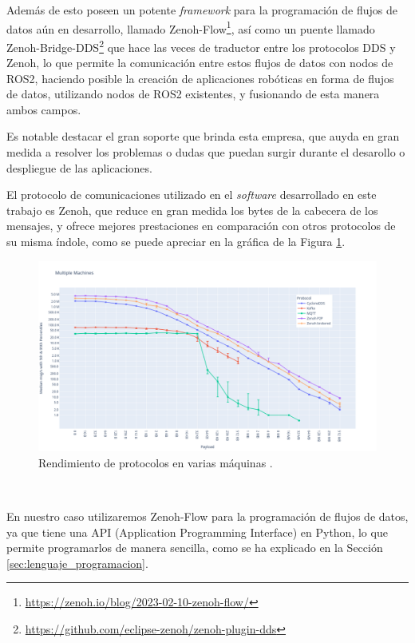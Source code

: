 Además de esto poseen un potente \textit{framework} para la programación de
flujos de datos aún en desarrollo, llamado
Zenoh-Flow\footnote{\url{https://zenoh.io/blog/2023-02-10-zenoh-flow/}}, así
como un puente llamado
Zenoh-Bridge-DDS\footnote{\url{https://github.com/eclipse-zenoh/zenoh-plugin-dds}}
que hace las veces de traductor entre los protocolos DDS y Zenoh, lo que permite
la comunicación entre estos flujos de datos con nodos de ROS2, haciendo posible
la creación de aplicaciones robóticas en forma de flujos de datos, utilizando
nodos de ROS2 existentes, y fusionando de esta manera ambos campos.

Es notable destacar el gran soporte que brinda esta empresa, que auyda en gran
medida a resolver los problemas o dudas que puedan surgir durante el desarollo o
despliegue de las aplicaciones.

El protocolo de comunicaciones utilizado en el \textit{software} desarrollado en
este trabajo es Zenoh, que reduce en gran medida los bytes de la cabecera de los
mensajes, y ofrece mejores prestaciones en comparación con otros protocolos de
su misma índole, como se puede apreciar en la gráfica de la Figura
\ref{fig:zenoh_performance}.

\begin{figure} [h!]
  \begin{center}
    \includegraphics[width=15cm]{figs/zenoh_performance}
  \end{center}
  \caption{Rendimiento de protocolos en varias máquinas \cite{zenoh_performance}.}
  \label{fig:zenoh_performance}
\end{figure}\

En nuestro caso utilizaremos Zenoh-Flow para la programación de flujos de datos,
ya que tiene una API (Application Programming Interface) en Python, lo que
permite programarlos de manera sencilla, como se ha explicado en la Sección
\ref{sec:lenguaje_programacion}.

